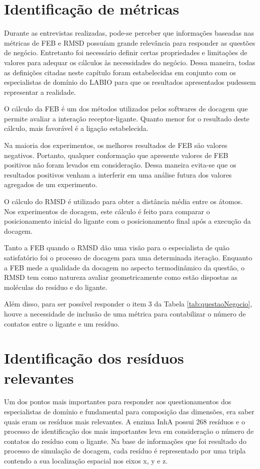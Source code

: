 \section{Identificação de métricas}

Durante as entrevistas realizadas, pode-se perceber que informações baseadas nas métricas de FEB e RMSD possuíam grande relevância para responder as questões de negócio. Entretanto foi necessário definir certas propriedades e limitações de valores para adequar os cálculos às necessidades do negócio. Dessa maneira, todas as definições citadas neste capítulo foram estabelecidas em conjunto com os especialistas de domínio do LABIO para que os resultados apresentados pudessem representar a realidade.

O cálculo da FEB é um dos métodos utilizados pelos softwares de docagem que permite avaliar a interação receptor-ligante. Quanto menor for o resultado deste cálculo, mais favorável é a ligação estabelecida. 

Na maioria dos experimentos, os melhores resultados de FEB são valores negativos. Portanto, qualquer conformação que apresente valores de FEB positivos não foram levados em consideração. Dessa maneira evita-se que os resultados positivos venham a interferir em uma análise futura dos valores agregados de um experimento. 

O cálculo do RMSD é utilizado para obter a distância média entre os átomos. Nos experimentos de docagem, este cálculo é feito para comparar o posicionamento inicial do ligante com o posicionamento final após a execução da docagem.

Tanto a FEB quando o RMSD dão uma visão para o especialista de quão satisfatório foi o processo de docagem para uma determinada iteração. Enquanto a FEB mede a qualidade da docagem no aspecto termodinâmico da questão, o RMSD tem como natureza avaliar geometricamente como estão dispostas as moléculas do resíduo e do ligante.

Além disso, para ser possível responder o item 3 da Tabela \ref{tab:questaoNegocio}, houve a necessidade de inclusão de uma métrica para contabilizar o número de contatos entre o ligante e um resíduo.



\section{Identificação dos resíduos relevantes}
Um dos pontos mais importantes para responder aos questionamentos dos especialistas de domínio e fundamental para composição das dimensões, era saber quais eram os resíduos mais relevantes. A enzima InhA possui 268 resíduos \cite{KARANADUNOSM09} e o processo de identificação dos mais importantes leva em consideração o número de contatos do resíduo com o ligante. Na base de informações que foi resultado do processo de simulação de docagem, cada resíduo é representado por uma tripla contendo a sua localização espacial nos eixos x, y e z.

